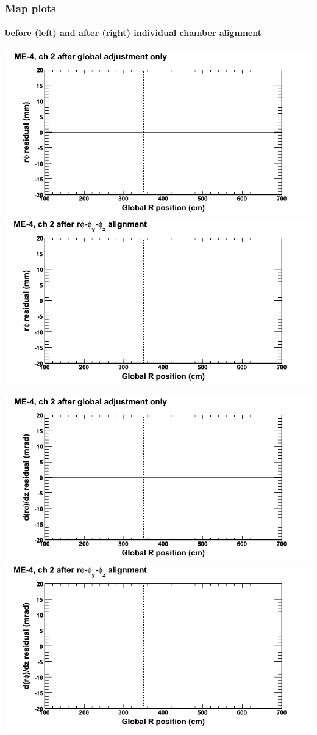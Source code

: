 \documentclass[compress]{beamer}
\begin{document}
\begin{frame}
\frametitle{Map plots}
\framesubtitle{before (left) and after (right) individual chamber alignment}
\includegraphics[width=0.5\linewidth]{ringmapplots_3dof/before_CSCvsr_mem4ch02_x.png} \includegraphics[width=0.5\linewidth]{ringmapplots_3dof/after_CSCvsr_mem4ch02_x.png}

\includegraphics[width=0.5\linewidth]{ringmapplots_3dof/before_CSCvsr_mem4ch02_dxdz.png} \includegraphics[width=0.5\linewidth]{ringmapplots_3dof/after_CSCvsr_mem4ch02_dxdz.png}
\end{frame}
\end{document}
